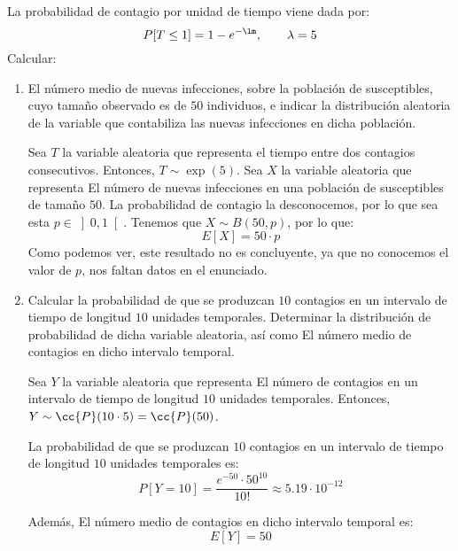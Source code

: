 \begin{ejercicio}
    La probabilidad de contagio por unidad de tiempo viene dada por:
    \begin{equation*}
        P[T \leq 1] = 1-e^{-\lm}, \qquad \lambda = 5
    \end{equation*}
    Calcular:
    \begin{enumerate}
        \item El número medio de nuevas infecciones, sobre la población de susceptibles, cuyo tamaño observado es de $50$ individuos, e indicar la distribución aleatoria de la variable que contabiliza las nuevas infecciones en dicha población.
        
        Sea $T$ la variable aleatoria que representa el tiempo entre dos contagios consecutivos. Entonces, $T\sim \exp(5)$.
        Sea $X$ la variable aleatoria que representa El número de nuevas infecciones en una población de susceptibles de tamaño $50$.
        La probabilidad de contagio la desconocemos, por lo que sea esta $p\in \left]0,1\right[$.
        Tenemos que $X\sim B(50,p)$, por lo que:
        \begin{equation*}
            E[X] = 50\cdot p
        \end{equation*}
        Como podemos ver, este resultado no es concluyente, ya que no conocemos el valor de $p$, nos faltan datos en el enunciado.

        \item Calcular la probabilidad de que se produzcan $10$ contagios en un intervalo de tiempo de longitud $10$ unidades temporales. Determinar la distribución de probabilidad de dicha variable aleatoria, así como El número medio de contagios en dicho intervalo temporal.
        
        Sea $Y$ la variable aleatoria que representa El número de contagios en un intervalo de tiempo de longitud $10$ unidades temporales. Entonces, $Y\sim \cc{P}(10\cdot 5) = \cc{P}(50)$.

        La probabilidad de que se produzcan $10$ contagios en un intervalo de tiempo de longitud $10$ unidades temporales es:
        \begin{equation*}
            P[Y=10] = \dfrac{e^{-50}\cdot 50^{10}}{10!} \approx 5.19\cdot 10^{-12}
        \end{equation*}

        Además, El número medio de contagios en dicho intervalo temporal es:
        \begin{equation*}
            E[Y] = 50
        \end{equation*}
        


\end{enumerate}
\end{ejercicio}
